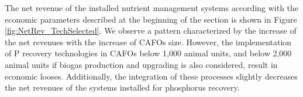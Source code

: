 \documentclass[authoryear]{elsarticle}
\begin{document}
The net revenue of the installed nutrient management systems according with the economic parameters described at the beginning of the section is shown in Figure \ref{fig:NetRev_TechSelected}. We observe a pattern characterized by the increase of the net revenues with the increase of CAFOs size. However, the implementation of P recovery technologies in CAFOs below 1,000 animal units, and below 2,000 animal units if biogas production and upgrading is also considered, result in economic looses. Additionally, the integration of these processes slightly decreases the net revenues of the systems installed for phosphorus recovery.



\end{document}
